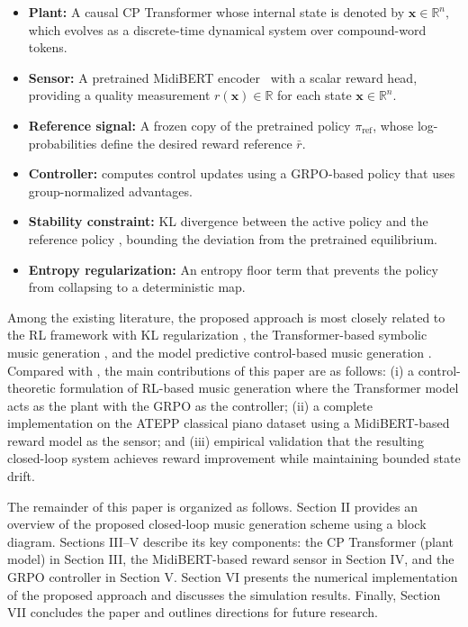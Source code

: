 \documentclass[letterpaper, 10 pt, conference]{ieeeconf}
\begin{document}
\begin{itemize}[leftmargin=*]
    \item \textbf{Plant:} A causal CP Transformer whose internal state is denoted by $\textbf{x}\in \mathbb{R}^{n},$ which evolves as a discrete-time dynamical system over compound-word tokens.
    \item \textbf{Sensor:} A pretrained MidiBERT encoder~\cite{midibertpiano} with a scalar reward head, providing a quality measurement $r(\textbf{x}) \in \mathbb{R}$ for each state $\textbf{x}\in \mathbb{R}^{n}$.
    \item \textbf{Reference signal:} A frozen copy of the pretrained policy $\pi_{\mathrm{ref}}$, whose log-probabilities define the desired reward reference $\bar{r}$.
    \item \textbf{Controller:} computes control updates using a GRPO-based policy that uses group-normalized advantages.
    \item \textbf{Stability constraint:} KL divergence between the active policy and the reference policy \cite{Jaques2016}, bounding the deviation from the pretrained equilibrium.
    \item \textbf{Entropy regularization:} An entropy floor term that prevents the policy from collapsing to a deterministic map.
\end{itemize}
Among the existing literature, the proposed approach is most closely related to the RL framework with KL regularization  \cite{Jaques2016}, the Transformer-based symbolic music generation  \cite{Huang2018}, and the model predictive control-based music generation  \cite{Augustine2025}. Compared with \cite{Jaques2016,Huang2018, Augustine2025}, the main contributions of this paper are as follows: (i) a control-theoretic formulation of RL-based music generation where the Transformer model acts as the plant with the GRPO as the controller; (ii) a complete implementation on the ATEPP classical piano dataset using a MidiBERT-based reward model as the sensor; and (iii) empirical validation that the resulting closed-loop system achieves reward improvement while maintaining bounded state drift.

\par The remainder of this paper is organized as follows. Section II provides an overview of the proposed closed-loop music generation scheme using a block diagram. Sections III–V describe its key components: the CP Transformer (plant model) in Section III, the MidiBERT-based reward sensor in Section IV, and the GRPO controller in Section V. Section VI presents the numerical implementation of the proposed approach and discusses the simulation results. Finally, Section VII concludes the paper and outlines directions for future research.
\end{document}
